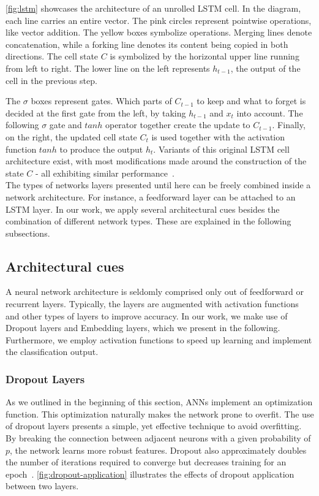 \autoref{fig:lstm} showcases the architecture of an unrolled LSTM cell. In the diagram, each line carries an entire vector. The pink circles represent pointwise operations, like vector addition. The yellow boxes symbolize operations. Merging lines denote concatenation, while a forking line denotes its content being copied in both directions. The cell state $C$ is symbolized by the horizontal upper line running from left to right. The lower line on the left represents $h_{t-1}$, the output of the cell in the previous step.

The $\sigma$ boxes represent gates. Which parts of $C_{t-1}$ to keep and what to forget is decided at the first gate from the left, by taking $h_{t-1}$ and $x_t$ into account. The following $\sigma$ gate and $tanh$ operator together create the update to $C_{t-1}$. Finally, on the right, the updated cell state $C_t$ is used together with the activation function $tanh$ to produce the output $h_t$. Variants of this original LSTM cell architecture exist, with most modifications made around the construction of the state $C$ - all exhibiting similar performance~\cite{greff2017lstm}.\\

The types of networks layers presented until here can be freely combined inside a network architecture.
For instance, a feedforward layer can be attached to an LSTM layer.
In our work, we apply several architectural cues besides the combination of different network types.
These are explained in the following subsections.

\subsection{Architectural cues}\label{sec:background:cues}
A neural network architecture is seldomly comprised only out of feedforward or recurrent layers.
Typically, the layers are augmented with activation functions and other types of layers to improve accuracy.
In our work, we make use of Dropout layers and Embedding layers, which we present in the following.
Furthermore, we employ activation functions to speed up learning and implement the classification output.

\subsubsection*{Dropout Layers}
As we outlined in the beginning of this section, ANNs implement an optimization function.
This optimization naturally makes the network prone to overfit.
The use of dropout layers presents a simple, yet effective technique to avoid overfitting.
By breaking the connection between adjacent neurons with a given probability of $p$, the network learns more robust features.
Dropout also approximately doubles the number of iterations required to converge but decreases training for an epoch~\cite{srivastava2014dropout}.
\autoref{fig:dropout-application} illustrates the effects of dropout application between two layers.

